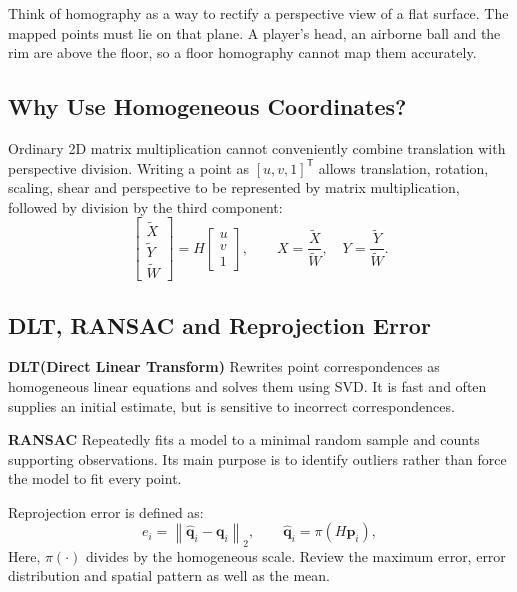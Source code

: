 \documentclass[11pt,a4paper,oneside]{report}
\begin{document}
\begin{conceptBox}
Think of homography as a way to rectify a perspective view of a flat surface. The mapped points must lie on that plane. A player's head, an airborne ball and the rim are above the floor, so a floor homography cannot map them accurately.
\end{conceptBox}

\subsection{Why Use Homogeneous Coordinates?}

Ordinary 2D matrix multiplication cannot conveniently combine translation with perspective division. Writing a point as $[u,v,1]^\mathsf{T}$ allows translation, rotation, scaling, shear and perspective to be represented by matrix multiplication, followed by division by the third component:
\[
\begin{bmatrix}\tilde X\\\tilde Y\\\tilde W\end{bmatrix}
=H\begin{bmatrix}u\\v\\1\end{bmatrix},
\qquad
X=\frac{\tilde X}{\tilde W},\quad
Y=\frac{\tilde Y}{\tilde W}.
\]

\subsection{DLT, RANSAC and Reprojection Error}

\begin{historyBox}
\textbf{DLT(Direct Linear Transform)}\quad
Rewrites point correspondences as homogeneous linear equations and solves them using SVD. It is fast and often supplies an initial estimate, but is sensitive to incorrect correspondences.

\textbf{RANSAC}\quad
Repeatedly fits a model to a minimal random sample and counts supporting observations. Its main purpose is to identify outliers rather than force the model to fit every point.
\end{historyBox}

Reprojection error is defined as:
\[
e_i=\left\|\widehat{\mathbf q}_i-\mathbf q_i\right\|_2,
\qquad
\widehat{\mathbf q}_i=\pi(H\mathbf p_i),
\]
Here, $\pi(\cdot)$ divides by the homogeneous scale. Review the maximum error, error distribution and spatial pattern as well as the mean.
\end{document}
